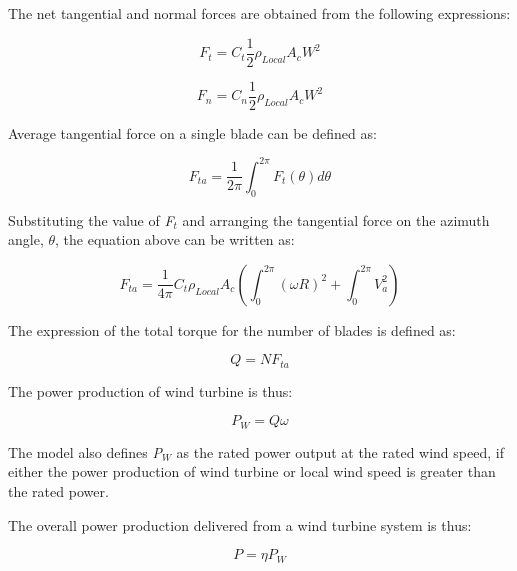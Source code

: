 The net tangential and normal forces are obtained from the following expressions:

\begin{equation}
{F_t} = {C_t}\frac{1}{2}{\rho_{Local}}{A_c}{W^2}
\end{equation}

\begin{equation}
{F_n} = {C_n}\frac{1}{2}{\rho_{Local}}{A_c}{W^2}
\end{equation}

Average tangential force on a single blade can be defined as:

\begin{equation}
{F_{ta}} = \frac{1}{{2\pi }}\int_0^{2\pi } {{F_t}(\theta )d\theta }
\end{equation}

Substituting the value of \emph{F\(_{t}\)} and arranging the tangential force on the azimuth angle, \(\theta\), the equation above can be written as:

\begin{equation}
{F_{ta}} = \frac{1}{{4\pi }}{C_t}{\rho_{Local}}{A_c}(\int_0^{2\pi } {{{(\omega R)}^2}}  + \int_0^{2\pi } {V_a^2} )
\end{equation}

The expression of the total torque for the number of blades is defined as:

\begin{equation}
Q = N{F_{ta}}
\end{equation}

The power production of wind turbine is thus:

\begin{equation}
{P_W} = Q\omega
\end{equation}

The model also defines \emph{P\(_{W}\)} as the rated power output at the rated wind speed, if either the power production of wind turbine or local wind speed is greater than the rated power.

The overall power production delivered from a wind turbine system is thus:

\begin{equation}
P = \eta {P_W}
\end{equation}

